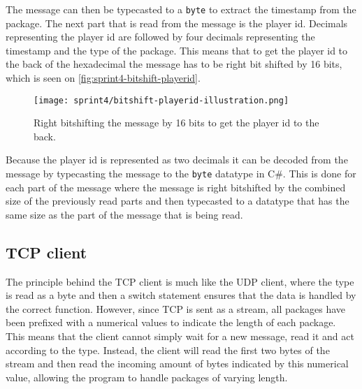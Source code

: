 The message can then be typecasted to a \texttt{byte} to extract the timestamp from the package.
The next part that is read from the message is the player id.
Decimals representing the player id are followed by four decimals representing the timestamp and the type of the package.
This means that to get the player id to the back of the hexadecimal the message has to be right bit shifted by 16 bits, which is seen on \autoref{fig:sprint4-bitshift-playerid}.
\begin{figure}[H]
    \centering
    \texttt{[image: sprint4/bitshift-playerid-illustration.png]}
    \caption{Right bitshifting the message by 16 bits to get the player id to the back.}
    \label{fig:sprint4-bitshift-playerid}
\end{figure}
Because the player id is represented as two decimals it can be decoded from the message by typecasting the message to the \texttt{byte} datatype in C\#.
This is done for each part of the message where the message is right bitshifted by the combined size of the previously read parts and then typecasted to a datatype that has the same size as the part of the message that is being read.
\subsection*{TCP client}
The principle behind the TCP client is much like the UDP client, where the type is read as a byte and then a switch statement ensures that the data is handled by the correct function.
However, since TCP is sent as a stream, all packages have been prefixed with a numerical values to indicate the length of each package.
This means that the client cannot simply wait for a new message, read it and act according to the type.
Instead, the client will read the first two bytes of the stream and then read the incoming amount of bytes indicated by this numerical value, allowing the program to handle packages of varying length.
